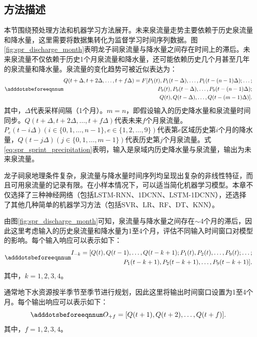 \subsection{方法描述}\label{sec:spr_method}

本节围绕预处理方法和机器学习方法展开。未来泉流量走势主要依赖于历史泉流量和降水量，这里需要将数据集转化为监督学习时间序列数据。图\ref{fig:spr_discharge_month}表明龙子祠泉流量与降水量之间存在时间上的滞后。未来泉流量不仅依赖于历史1个月泉流量和降水量，还可能依赖历史几个月甚至几年的泉流量和降水量。泉流量的变化趋势可被近似表达为：
\begin{equation}\adddotsbeforeeqnnum
  \label{eq:spr_sprint_precipitation}
  \begin{split}
    Q(t+\Delta,t+2\Delta,\ldots,t+f\Delta)
    =F[P_1(t),P_1(t-\Delta),\ldots,P_1(t-(n-1)\Delta);\ldots;\\
    P_9(t),P_9(t-\Delta),\ldots,P_9(t-(n-1)\Delta);\\
    Q(t),Q(t-\Delta),\ldots,Q(t-(m-1)\Delta)].
  \end{split}
\end{equation}
其中，$\Delta$代表采样间隔（1个月）。$m=n$，即假设输入的历史降水量和泉流量时间同步。$Q(t+\Delta,t+2\Delta,\ldots,t+f\Delta)$代表未来$f$个月泉流量。$P_e(t-i\Delta)(i\in\{0,1,\ldots,n-1\},e\in\{1,2,\ldots,9\})$代表第$e$区域历史第$i$个月的降水量，$Q(t-j\Delta)(j\in\{0,1,\ldots,m-1\})$代表历史第$j$个月泉流量。式\ref{eq:spr_sprint_precipitation}表明，输入是泉域内历史降水量与泉流量，输出为未来泉流量。

龙子祠泉地理条件复杂，泉流量与降水量时间序列均呈现出复杂的非线性特征，而且可用泉流量的记录有限。在小样本情况下，可以适当简化机器学习模型。本章不仅选择了三种神经网络（包括LSTM-RNN、1DCNN、LSTM-1DCNN），还选择了其他几种简单的机器学习方法（包括SVR、LR、RF、DT、KNN）。

由图\ref{fig:spr_discharge_month}可知，泉流量与降水量之间存在$\sim$4个月的滞后，因此这里考虑输入的历史泉流量和降水量为1至4个月，评估不同输入时间窗口对模型的影响。每个输入响应可以表示如下：
\begin{equation}\adddotsbeforeeqnnum
  \label{eq:spr_input}
  \begin{split}
    I_{-k}=[Q(t),Q(t-1),\ldots,Q(t-k+1);P_1(t),P_2(t),\ldots,P_9(t);\ldots;\\
    P_1(t-k+1),P_2(t-k+1),\ldots,P_9(t-k+1)].
  \end{split}
\end{equation}
其中，$k=1,2,3,4$。

通常地下水资源按半季节至季节进行规划，因此这里将输出时间窗口设置为1至4个月。每个输出响应可以表示如下：
\begin{equation}\adddotsbeforeeqnnum
  \label{eq:spr_output}
  O_{+f}=[Q(t+1),Q(t+2),\ldots,Q(t+f)].
\end{equation}
其中，$f=1,2,3,4$。

